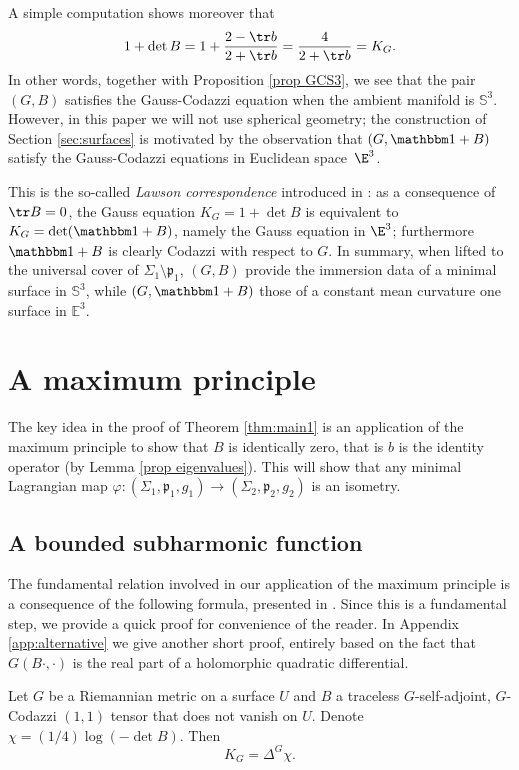 \begin{remark} \label{rmk lawson}
A simple computation shows moreover that
\[
1+\det B=1+\frac{2-\tr b}{2+\tr b}=\frac{4}{2+\tr b}=K_G.
\]
In other words, together with Proposition \ref{prop GCS3}, we see that the pair $(G,B)$ satisfies the Gauss-Codazzi equation when the ambient manifold is $\mathbb S^3$. However, in this paper we will not use spherical geometry; the construction of Section \ref{sec:surfaces} is motivated by the observation that $(G,\mathbbm 1+B)$ satisfy the Gauss-Codazzi equations in Euclidean space~$\E^3$.

This is the so-called \emph{Lawson correspondence} introduced in \cite{zbMATH03327055}: as a consequence of $\tr  B=0$, the Gauss equation $K_G=1+\det B$ is equivalent to $K_G=\det(\mathbbm 1+B)$, namely the Gauss equation in $\E^3$; furthermore $\mathbbm 1+B$ is clearly Codazzi with respect to $G$. In summary, when lifted to the universal cover of $\Sigma_1\setminus\mathfrak p_1$, $(G,B)$ provide the immersion data of a minimal surface in $\mathbb S^3$, while $(G,\mathbbm 1+B)$ those of a constant mean curvature one surface in $\mathbb E^3$.
\end{remark}

\section{A maximum principle}

The key idea in the proof of Theorem \ref{thm:main1} is an application of the maximum principle to show that $B$ is identically zero, that is $b$ is the identity operator (by Lemma \ref{prop eigenvalues}). This will show that any minimal Lagrangian map $\varphi:(\Sigma_1,\mathfrak p_1,g_1)\to (\Sigma_2,\mathfrak p_2,g_2)$ is an isometry.

\subsection{A bounded subharmonic function}

The fundamental relation involved in our application of the maximum principle is a consequence of the following formula, presented in \cite[Lem.\,3.11]{zbMATH05200423}. Since this is a fundamental step, we provide a quick proof for convenience of the reader. In Appendix \ref{app:alternative} we give another short proof, entirely based on the fact that $G(B\cdot,\cdot)$ is the real part of a holomorphic quadratic differential.

\begin{lemma}\label{lemma laplace}
Let $G$ be a Riemannian metric on a surface $U$ and $B$ a traceless $G$-self-adjoint, $G$-Codazzi $(1,1)$ tensor that does not vanish on $U$. Denote $\chi=(1/4)\log(-\det B)$. Then
\[
K_G=\Delta^G\chi.
\]
\end{lemma}

